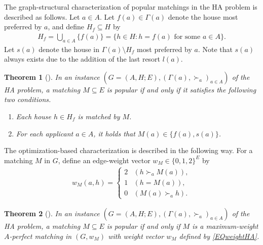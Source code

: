 \documentclass[11pt,a4paper,showkeys]{article}
\theoremstyle{plain}
\newtheorem{theorem}{Theorem}[section]
\theoremstyle{definition}
\begin{document}

The graph-structural characterization of popular matchings in the HA problem \cite{AIKM07} is described as follows. 
Let $a\in A$. 
Let $f(a) \in \Gamma(a)$ denote the house most preferred by $a$, 
and define $H_f\subseteq H$ by 
\begin{align*}
H_f=\bigcup_{a\in A}\{f(a)\}=\{h\in H\colon \mbox{$h=f(a)$ for some $a\in A$}\}.     
\end{align*}
Let $s(a)$ denote the house in $\Gamma(a) \setminus H_f$ most preferred by $a$. 
Note that $s(a)$ always exists due to the addition of the last resort $l(a)$. 

\begin{theorem}[\cite{AIKM07}]
    \label{THMgraphHA}
    In an instance $(G=(A,H;E),(\Gamma(a),\succ_a)_{a\in A})$ of the HA problem, 
    a matching $M\subseteq E$ is popular if and only if it satisfies the following two conditions. 
    \begin{enumerate}
        \item Each house $h \in H_f$ is matched by $M$. 
            \label{ENUgraphHA1}
        \item For each applicant $a\in A$, it holds that $M(a)\in \{f(a),s(a)\}$. 
            \label{ENUgraphHA2}
    \end{enumerate}
\end{theorem}


The optimization-based characterization \cite{KMN11,McC08} 
is described in the following way. 
For a matching $M$ in $G$, 
define 
an edge-weight vector $w_M\in \{0,1,2\}^E$ by 
\begin{align}
\label{EQweightHA}
    w_M(a,h)=
    \begin{cases}
        2 & (h \succ_a M(a)), \\
        1 & (h = M(a)), \\
        0 & (M(a) \succ_a h). 
    \end{cases}
\end{align}


\begin{theorem}[\cite{KMN11,McC08}]
    \label{THMopt}
    In an instance $(G=(A,H;E),(\Gamma(a),\succ_a)_{a\in A})$ of the HA problem, 
    a matching $M\subseteq E$ is popular if and only if $M$ is a maximum-weight $A$-perfect matching in $(G,w_M)$ 
    with weight vector $w_M$ defined by \eqref{EQweightHA}. 
\end{theorem}
\end{document}
